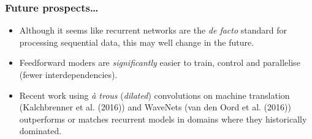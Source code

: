 \documentclass{beamer}
\begin{document}
\begin{frame}
	\frametitle{Future prospects\dots}
	\begin{itemize}
		\item Although it seems like recurrent networks are the \emph{de facto} standard for processing sequential data, this may well change in the future.
		\vfill
		\item Feedforward moders are \emph{significantly} easier to train, control and parallelise (fewer interdependencies).
		\vfill
		\item Recent work using \emph{\`{a} trous} (\emph{dilated}) convolutions on machine translation (Kalchbrenner et al. (2016)) and WaveNets (van den Oord et al. (2016)) outperforms or matches recurrent models in domains where they historically dominated.
	\end{itemize}
\end{frame}
\end{document}
